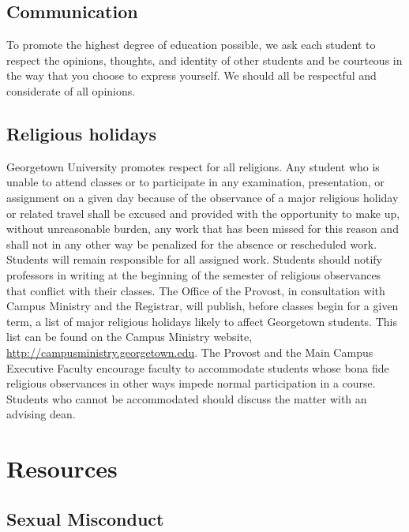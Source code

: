 \documentclass[
  letterpaper,
  DIV=11,
  numbers=noendperiod]{scrartcl}
\begin{document}
\subsection{\texorpdfstring{\textbf{Communication}}{Communication}}\label{communication}

To promote the highest degree of education possible, we ask each student
to respect the opinions, thoughts, and identity of other students and be
courteous in the way that you choose to express yourself. We should all
be respectful and considerate of all opinions.

\subsection{\texorpdfstring{\textbf{Religious
holidays}}{Religious holidays}}\label{religious-holidays}

Georgetown University promotes respect for all religions. Any student
who is unable to attend classes or to participate in any examination,
presentation, or assignment on a given day because of the observance of
a major religious holiday or related travel shall be excused and
provided with the opportunity to make up, without unreasonable burden,
any work that has been missed for this reason and shall not in any other
way be penalized for the absence or rescheduled work. Students will
remain responsible for all assigned work. Students should notify
professors in writing at the beginning of the semester of religious
observances that conflict with their classes. The Office of the Provost,
in consultation with Campus Ministry and the Registrar, will publish,
before classes begin for a given term, a list of major religious
holidays likely to affect Georgetown students. This list can be found on
the Campus Ministry website,
\href{http://campusministry.georgetown.edu/}{http://campusministry.georgetown.edu}.
The Provost and the Main Campus Executive Faculty encourage faculty to
accommodate students whose bona fide religious observances in other ways
impede normal participation in a course. Students who cannot be
accommodated should discuss the matter with an advising dean.

\section{\texorpdfstring{\textbf{Resources}}{Resources}}\label{resources}

\subsection{\texorpdfstring{\textbf{Sexual
Misconduct}}{Sexual Misconduct}}\label{sexual-misconduct}
\end{document}
